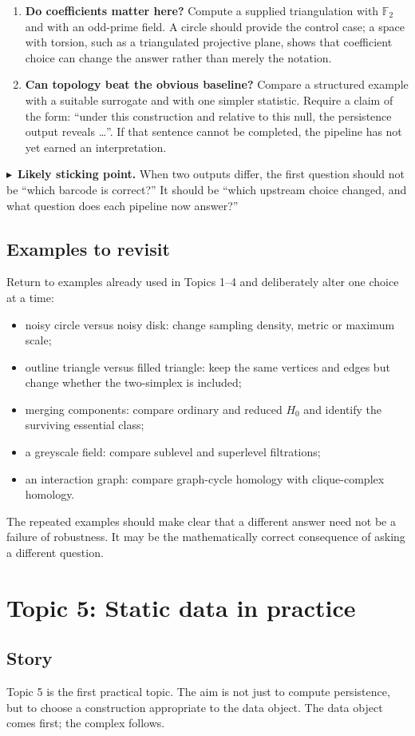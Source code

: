 \documentclass[11pt,a4paper]{article}
\newcommand{\weekheading}[2]{%
\section*{Topic #1: #2}
\addcontentsline{toc}{section}{Topic #1: #2}
}
\newcommand{\planningbox}[2]{%
\subsection*{#1}
#2
}
\newcommand{\stickingpoint}[1]{%
\par\smallskip
\noindent\textcolor{red!65!black}{\(\blacktriangleright\)\ \textbf{Likely sticking point.}} #1
\par\smallskip
}
\begin{document}
{\begin{enumerate}
    \item \textbf{Do coefficients matter here?} Compute a supplied triangulation
    with $\mathbb{F}_2$ and with an odd-prime field. A circle should provide the
    control case; a space with torsion, such as a triangulated projective plane,
    shows that coefficient choice can change the answer rather than merely the
    notation.

    \item \textbf{Can topology beat the obvious baseline?} Compare a structured
    example with a suitable surrogate and with one simpler statistic. Require a
    claim of the form: ``under this construction and relative to this null, the
    persistence output reveals \ldots''. If that sentence cannot be completed,
    the pipeline has not yet earned an interpretation.
\end{enumerate}

\stickingpoint{When two outputs differ, the first question should not be ``which
barcode is correct?'' It should be ``which upstream choice changed, and what
question does each pipeline now answer?''}
}

\planningbox{Examples to revisit}{
Return to examples already used in Topics 1--4 and deliberately alter one choice
at a time:
\begin{itemize}
    \item noisy circle versus noisy disk: change sampling density, metric or
    maximum scale;
    \item outline triangle versus filled triangle: keep the same vertices and
    edges but change whether the two-simplex is included;
    \item merging components: compare ordinary and reduced $H_0$ and identify
    the surviving essential class;
    \item a greyscale field: compare sublevel and superlevel filtrations;
    \item an interaction graph: compare graph-cycle homology with clique-complex
    homology.
\end{itemize}
The repeated examples should make clear that a different answer need not be a
failure of robustness. It may be the mathematically correct consequence of
asking a different question.
}


\weekheading{5}{Static data in practice}

\planningbox{Story}{
Topic 5 is the first practical topic. The aim is not just to compute persistence,
but to choose a construction appropriate to the data object. The data object
comes first; the complex follows.
}
\end{document}

